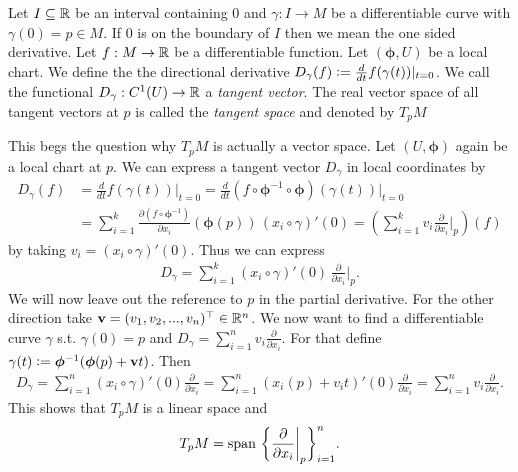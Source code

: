 \documentclass[../master_thesis.tex]{subfiles}
\begin{document}
\begin{definition}
    Let $I \subseteq \mathbb{R}$ be an interval containing $0$ and 
    $\gamma: I \rightarrow M$ be a differentiable curve with $\gamma(0) = p \in M$.
    If $0$ is on the boundary of $I$ then we mean the one sided derivative.
    Let $f:M \rightarrow \mathbb{R}$ be a differentiable function. Let
    $(\boldsymbol{\phi},U)$ be a local chart.
    We define the the directional derivative 
    $D_\gamma(f) \vcentcolon= \frac{d}{dt} f(\gamma(t)) |_{t=0}$.
    We call the functional $D_\gamma: C^1(U) \rightarrow \mathbb{R}$ 
    a \textit{tangent vector}. 
    The real vector space of all tangent vectors at $p$ is called the 
    \textit{tangent space} and denoted by $T_p M$    
\end{definition}
This begs the question why $T_p M$ is actually a vector space. Let $(U,\boldsymbol{\phi})$ 
again be a local chart at $p$.
We can 
express a tangent vector $D_\gamma$ in local coordinates by 
\begin{align}
    D_\gamma(f) &=  \frac{d}{dt} f(\gamma(t)) \big|_{t=0}
    =  \frac{d}{dt} (f \circ \boldsymbol{\phi}^{-1} \circ \boldsymbol{\phi})  (\gamma(t)) \big|_{t=0}
    \\ &= \sum\limits_{i=1}^k \frac{\partial (f \circ \boldsymbol{\phi}^{-1})}{\partial x_i} 
        (\boldsymbol{\phi}(p))
        \, (x_i\circ \gamma)'(0)
    = (\sum\limits_{i=1}^k v_i  \frac{\partial}{\partial x_i}\Big|_p )(f)
\end{align}
by taking $v_i = (x_i\circ \gamma)'(0)$. Thus we can express 
\begin{align*}
    D_\gamma = \sum\limits_{i=1}^k 
    (x_i \circ \gamma)' (0) \, \frac{\partial}{\partial x_i}\bigg|_p.
\end{align*}
We will now leave out the reference to $p$ in the partial derivative.
For the other direction take $\mathbf{v} = (v_1, v_2, ..., v_n)^\top \in \mathbb{R}^n$. 
We now want to find a differentiable curve $\gamma$ s.t. $\gamma(0) = p$ 
and $D_\gamma = \sum_{i=1}^n v_i \frac{\partial}{\partial x_i}$.
For that define $\gamma(t) \vcentcolon= \boldsymbol{\phi}^{-1} (\boldsymbol{\phi}(p) + \mathbf{v}t)$.
Then
\begin{align*}
    D_\gamma = \sum_{i=1}^n (x_i\circ \gamma)'(0) \frac{\partial}{\partial x_i}
    = \sum_{i=1}^n (x_i(p) + v_i t)'(0) \frac{\partial}{\partial x_i}
    = \sum_{i=1}^n v_i \frac{\partial}{\partial x_i}.
\end{align*}
This shows that $T_p M$ is a linear space and 
\begin{align*}
    T_p M = \operatorname{span}\, 
        \bigg\{ \frac{\partial}{\partial x_i}\bigg|_p \bigg\}_{i=1}^n.
\end{align*}
\end{document}
